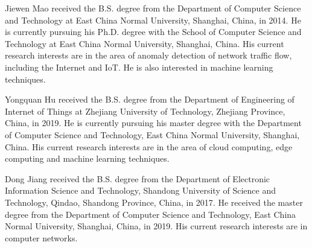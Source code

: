 \documentclass{ieeeaccess}
\theoremstyle{definition}
\begin{document}
\begin{IEEEbiography}{Jiewen Mao}
    received the B.S. degree from the Department of Computer Science and Technology at East China Normal University, Shanghai, China, in 2014. He is currently pursuing his Ph.D. degree with the School of Computer Science and Technology at East China Normal University, Shanghai, China. His current research interests are in the area of anomaly detection of network traffic flow, including the Internet and IoT. He is also interested in machine learning techniques.
\end{IEEEbiography}

\begin{IEEEbiography}{Yongquan Hu}
    received the B.S. degree from the Department of Engineering of Internet of Things at Zhejiang University of Technology, Zhejiang Province, China, in 2019. He is currently pursuing his master degree with the Department of Computer Science and Technology, East China Normal University, Shanghai, China. His current research interests are in the area of cloud computing, edge computing and machine learning techniques.
\end{IEEEbiography}

\begin{IEEEbiography}{Dong Jiang}
    received the B.S. degree from the Department of Electronic Information Science and Technology, Shandong University of Science and Technology, Qindao, Shandong Province, China, in 2017. He received the master degree from the Department of Computer Science and Technology, East China Normal University, Shanghai, China, in 2019. His current research interests are in computer networks.
\end{IEEEbiography}
\end{document}
